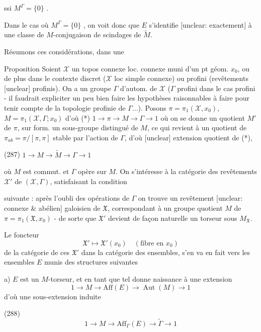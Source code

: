 ssi $M^\Gamma = \{0\}$ .

Dans le cas où $M^\Gamma = \{0\}$ , on voit
donc que $E$ s'identifie [unclear: exactement] à
une classe de $M$-conjugaison de
scindages de $\tilde{M}$.

\newpage


Résumons ces considérations, dans une

Proposition Soient $\mathcal{X}$ un topos connexe
loc. connexe muni d'un pt géom.
$x_0$, ou de plus dans le contexte discret
($\mathcal{X}$ loc simple connexe) ou profini
(revêtements [unclear] profinis).
On a un groupe $\Gamma$ d'autom. de $\mathcal{X}$
($\Gamma$ profini dans le cas profini - il faudrait
expliciter un peu bien faire les hypothèses
raisonnables à faire pour tenir compte
de la topologie profinie de $\Gamma$...). Posons
$\pi = \pi_1(\mathcal{X}, x_0)$, $M = \pi_1(\mathcal{X}, \Gamma; x_0)$ d'où
(*) $1 \to \pi \to M \to \Gamma \to 1$
où on se donne un quotient $M'$ de $\pi$, sur
form. un sous-groupe distingué de $M$,
ce qui revient à un quotient de
$\pi_{ab} = \pi/[\pi,\pi]$ stable par l'action de $\Gamma$,
d'où [unclear] extension quotient de (*),

(287) $1 \to M \to \tilde{M} \to \Gamma \to 1$

où $M$ est commut. et $\Gamma$ opère sur $M$.
On s'intéresse à la catégorie des revêtements
$\mathcal{X}'$ de $(\mathcal{X}, \Gamma)$, satisfaisant la condition

\newpage


suivante : après l'oubli des opérations de $\Gamma$ on trouve un revêtement [unclear: connexe & abélien] galoisien de $\mathfrak{X}$, correspondant à un groupe quotient $M$ de $\pi = \pi_1(\mathfrak{X}, x_0)$ - de sorte que $\mathfrak{X}'$ devient de façon naturelle un torseur sous $M_{\mathfrak{X}}$.

Le foncteur
$$ \mathfrak{X}' \longmapsto \mathfrak{X}'(x_0) \quad (\text{fibre en } x_0) $$
de la catégorie de ces $\mathfrak{X}'$ dans la catégorie des ensembles, s'en va en fait vers les ensembles $E$ munis des structures suivantes

a) $E$ est un $M$-torseur, et en tant que tel donne naissance à une extension
$$ 1 \to M \to \text{Aff}(E) \to \operatorname{Aut}(M) \to 1 $$
d'où une sous-extension induite

(288)
$$ 1 \to M \to \text{Aff}_\Gamma(E) \to \tilde{\Gamma} \to 1 $$

